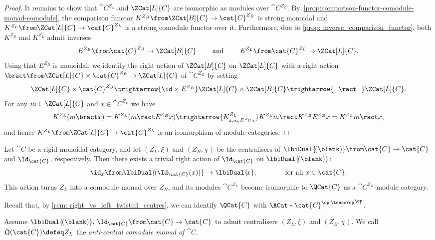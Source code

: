 \begin{proof}
  It remains to show that \(\cat{C}^{Z_L}\) and \(\ZCat[L]{C}\) are isomorphic as modules over \(\cat{C}^{Z_B}\).
  By~\cref{prop:comparison-functor-comodule-monad-comodule}, the comparison functor
  \(K^{Z_B} \from \ZCat[B]{C} \to \cat{C}^{Z_B}\) is strong monoidal
  and \(K^{Z_L} \from \ZCat[L]{C} \to \cat{C}^{Z_L}\) is a strong comodule functor over it.
  Furthermore, due to \cref{prop: inverse_comparison_functor},
  both \(K^{Z_B}\) and \(K^{Z_L}\)  admit inverses
  \[
    E^{Z_B} \from \cat{C}^{Z_B} \to \ZCat[B]{C}
    \qquad \text{ and } \qquad
    E^{Z_L} \from \cat{C}^{Z_L} \to \ZCat[L]{C}.
  \]
  Using that \(E^{Z_B}\) is monoidal, we identify the right action of \(\ZCat[B]{C}\) on \(\ZCat[L]{C}\)
  with a right action \(\bract\from\ZCat[L]{C} \times \cat{C}^{Z_B} \to \ZCat[L]{C} \) of \(\cat{C}^{Z_B}\) by setting
  \[
    \ZCat[L]{C} \times \cat{C}^{Z_B} \trightarrow{\id \times E^{Z_B}}
    \ZCat[L]{C} \times \ZCat[B]{C} \trightarrow{\ \ \ract \ \ }
    \ZCat[L]{C}.
  \]
  For any \(m \in \ZCat[L]{C}\) and \(x \in \cat{C}^{Z_B}\) we have
  \[
    K^{Z_L} (m \bract x)
    =
    K^{Z_L} (m \ract E^{Z_B}x)
    \trightarrow{K^{Z_L}_{\mathsf{a};m, E^{Z_B}x}} K^{Z_L}m \ract K^{Z_B}E^{Z_B}x = K^{Z_L}m \ract x,
  \]
  and hence \(K^{Z_L} \from \ZCat[L]{C} \to \cat{C}^{Z_L}\) is an isomorphism of module categories.
\end{proof}

\begin{example}
  Let \(\cat{C}\) be a rigid monoidal category, and
  let \((Z_L, \xi)\) and  \((Z_B, \chi)\) be
  the centralisers of \(\lbiDual{\!(\blank)}\from \cat{C}\to \cat{C}\) and \(\Id_{\cat{C}}\), respectively.
  Then there exists a trivial right action of \(\Id_{\cat{C}}\) on \(\lbiDual{\!(\blank)}\):
  \[
    \id_x\from \lbiDual{\!(\Id_{\cat{C}} (x))} \to \lbiDual{\!x}, \qquad \qquad \text{for all } x \in \cat{C}.
  \]
  This action turns \(Z_L\) into a comodule monad over \(Z_B\),
  and its modules \(\cat{C}^{Z_L}\) become isomorphic to \(\QCat{C}\) as a \(\cat{C}^{Z_B}\)\hyp{}module category.
\end{example}

Recall that,
by \cref{rem: right_vs_left_twisted_centres},
we can identify \(\QCat{C}\) with \({\ACat*{\cat{C}^{\op,\tensorop}}}^{\op}\).

\begin{definition}\label{def: anti_central_comodule_monad}
  Assume \(\lbiDual{\!(\blank)},\, \Id_{\cat{C}}\from \cat{C} \to \cat{C}\) to admit centralisers \((Z_L, \xi)\) and \((Z_B, \chi)\).
  We call \(\mathfrak{Q}(\cat{C}) \defeq Z_L\) the \emph{anti\hyp{}central comodule monad of \(\cat{C}\)}.
\end{definition}

